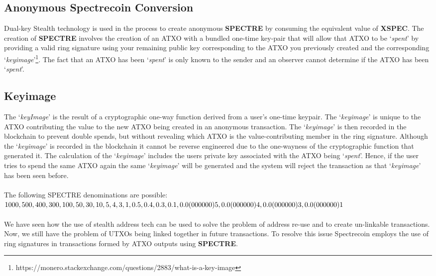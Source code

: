 \subsection{Anonymous Spectrecoin Conversion}
Dual-key Stealth technology is used in the process to create anonymous 
\textbf{SPECTRE} by consuming the equivalent value of \textbf{XSPEC}. The 
creation of \textbf{SPECTRE} involves the creation of an ATXO with a 
bundled one-time key-pair that will allow that ATXO to be ‘\textit{spent}’ 
by providing a valid ring signature using your remaining public key 
corresponding to the ATXO you previously created and the corresponding 
‘\textit{keyimage}’\footnote{https://monero.stackexchange.com/questions/2883/what-is-a-key-image}. 
The fact that an ATXO has been ‘\textit{spent}’ is only known to the sender 
and an observer cannot determine if the ATXO has been ‘\textit{spent}’.



\subsection{Keyimage}
The ‘\textit{keyImage}’ is the result of a cryptographic one-way function derived
from a user’s one-time keypair. The ‘\textit{keyimage}’ is unique to the ATXO
contributing the value to the new ATXO being created in an anonymous
transaction. The ‘\textit{keyimage}’ is then recorded in the blockchain to prevent
double spends, but without revealing which ATXO is the value-contributing
member in the ring signature. Although the ‘\textit{keyimage}’ is recorded in the
blockchain it cannot be reverse engineered due to the one-wayness of the
cryptographic function that generated it. The calculation of the ‘\textit{keyimage}’
includes the users private key associated with the ATXO being ‘\textit{spent}’.
Hence, if the user tries to spend the same ATXO again the same ‘\textit{keyimage}’
will be generated and the system will reject the transaction as that
‘\textit{keyimage}’ has been seen before.
\\
\\
The following SPECTRE denominations are possible:
\\
$1000, 500, 400, 300, 100, 50, 30, 10, 5, 4, 3, 1, \\0.5, 0.4, 0.3, 0.1, 0.0(000000)5, 0.0(000000)4, 0.0(000000)3, 0.0(000000)1$
\\
\\
\noindent
We have seen how the use of stealth address tech can be used to solve the
problem of address re-use and to create un-linkable transactions. Now, we
still have the problem of UTXOs being linked together in future transactions.
To resolve this issue Spectrecoin employs the use of ring signatures in
transactions formed by ATXO outputs using \textbf{SPECTRE}.
